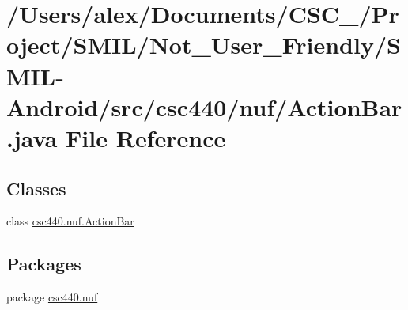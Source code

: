 \hypertarget{_s_m_i_l-_android_2src_2csc440_2nuf_2_action_bar_8java}{\section{/\-Users/alex/\-Documents/\-C\-S\-C\-\_/\-Project/\-S\-M\-I\-L/\-Not\-\_\-\-User\-\_\-\-Friendly/\-S\-M\-I\-L-\/\-Android/src/csc440/nuf/\-Action\-Bar.java File Reference}
\label{_s_m_i_l-_android_2src_2csc440_2nuf_2_action_bar_8java}
}
\subsection*{Classes}
\begin{DoxyCompactItemize}
\item 
class \hyperlink{classcsc440_1_1nuf_1_1_action_bar}{csc440.\-nuf.\-Action\-Bar}
\end{DoxyCompactItemize}
\subsection*{Packages}
\begin{DoxyCompactItemize}
\item 
package \hyperlink{namespacecsc440_1_1nuf}{csc440.\-nuf}
\end{DoxyCompactItemize}

